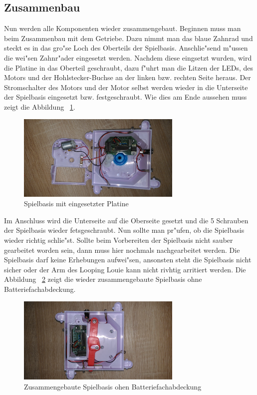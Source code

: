 \newpage
\subsection{Zusammenbau}

Nun werden alle Komponenten wieder zusammengebaut.
Beginnen muss man beim Zusammenbau mit dem Getriebe. Dazu nimmt man das blaue Zahnrad und steckt es in das gro"se Loch des Oberteils der Spielbasis. Anschlie"send m"ussen die wei"sen Zahnr"ader eingesetzt werden. Nachdem diese eingsetzt wurden, wird die Platine in das Oberteil geschraubt, dazu f"uhrt man die Litzen der LEDs, des Motors und der Hohlstecker-Buchse an der linken bzw. rechten Seite heraus. Der Stromschalter des Motors und der Motor selbst werden wieder in die Unterseite der Spielbasis eingesetzt bzw. festgeschraubt. Wie dies am Ende aussehen muss zeigt die Abbildung ~\ref{fig23}.

\vspace{0.5cm}
\begin{figure}[!ht]
	\centering
  	\includegraphics[width=0.7\textwidth]{pictures/loolou_023.jpg}
	\caption{Spielbasis mit eingesetzter Platine}
	\label{fig23}
\end{figure}
\vspace{0.5cm} 

Im Anschluss wird die Unterseite auf die Oberseite gesetzt und die 5 Schrauben der Spielbasis wieder fetsgeschraubt. Nun sollte man pr"ufen, ob die Spielbasis wieder richtig schlie"st. Sollte beim Vorbereiten der Spielbasis nicht sauber gearbeitet worden sein, dann muss hier nochmals nachgearbeitet werden. Die Spielbasis darf keine Erhebungen aufwei"sen, ansonsten steht die Spielbasis nicht sicher oder der Arm des Looping Louie kann nicht rivhtig arritiert werden.
Die Abbildung ~\ref{fig24} zeigt die wieder zusammengebaute Spielbasis ohne Batteriefachabdeckung.

\vspace{0.5cm}
\begin{figure}[!ht]
	\centering
  	\includegraphics[width=0.7\textwidth]{pictures/loolou_024.jpg}
	\caption{Zusammengebaute Spielbasis ohen Batteriefachabdeckung}
	\label{fig24}
\end{figure}
\vspace{0.5cm} 

